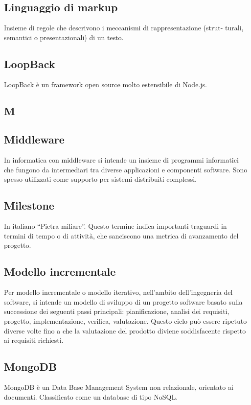 \subsection{Linguaggio di markup}
Insieme di regole che descrivono i meccanismi di rappresentazione (strut-
turali, semantici o presentazionali) di un testo.

\subsection{LoopBack}
LoopBack è un framework open source molto estensibile di Node.js. 

\newpage

\begin{center}
\Huge\section{\uppercase{M}}
\end{center}

\subsection{Middleware}
In informatica con middleware si intende un insieme di programmi informatici che fungono da intermediari tra diverse applicazioni e componenti software. Sono spesso utilizzati come supporto per sistemi distribuiti complessi.

\subsection{Milestone}
In italiano “Pietra miliare”. Questo termine indica importanti traguardi in termini di
tempo o di attività, che sanciscono una metrica di avanzamento del progetto.

\subsection{Modello incrementale}
Per modello incrementale o modello iterativo, nell'ambito dell'ingegneria
del software, si intende un modello di sviluppo di un progetto software basato sulla successione
dei seguenti passi principali: pianificazione, analisi dei requisiti, progetto, implementazione,
verifica, valutazione. Questo ciclo può essere ripetuto diverse volte fino a che la valutazione
del prodotto diviene soddisfacente rispetto ai requisiti richiesti.

\subsection{MongoDB}
MongoDB è un Data Base Management System non relazionale, orientato ai documenti. Classificato come un database di tipo NoSQL.

